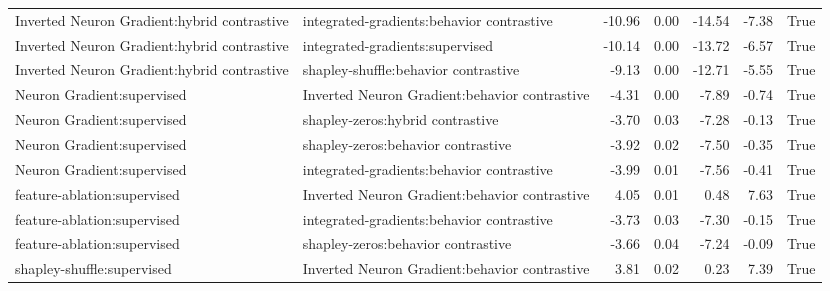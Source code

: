 \begin{table*}[ht]
{\begin{tabular}{llrrrrr}
 Inverted Neuron Gradient:hybrid contrastive & integrated-gradients:behavior contrastive & -10.96 & 0.00 & -14.54 & -7.38 & True \\
 Inverted Neuron Gradient:hybrid contrastive & integrated-gradients:supervised & -10.14 & 0.00 & -13.72 & -6.57 & True \\
 Inverted Neuron Gradient:hybrid contrastive & shapley-shuffle:behavior contrastive & -9.13 & 0.00 & -12.71 & -5.55 & True \\
 Neuron Gradient:supervised & Inverted Neuron Gradient:behavior contrastive & -4.31 & 0.00 & -7.89 & -0.74 & True \\
 Neuron Gradient:supervised & shapley-zeros:hybrid contrastive & -3.70 & 0.03 & -7.28 & -0.13 & True \\
 Neuron Gradient:supervised & shapley-zeros:behavior contrastive & -3.92 & 0.02 & -7.50 & -0.35 & True \\
 Neuron Gradient:supervised & integrated-gradients:behavior contrastive & -3.99 & 0.01 & -7.56 & -0.41 & True \\
 feature-ablation:supervised & Inverted Neuron Gradient:behavior contrastive & 4.05 & 0.01 & 0.48 & 7.63 & True \\
 feature-ablation:supervised & integrated-gradients:behavior contrastive & -3.73 & 0.03 & -7.30 & -0.15 & True \\
 feature-ablation:supervised & shapley-zeros:behavior contrastive & -3.66 & 0.04 & -7.24 & -0.09 & True \\
 shapley-shuffle:supervised & Inverted Neuron Gradient:behavior contrastive & 3.81 & 0.02 & 0.23 & 7.39 & True \\
\bottomrule
\end{tabular}
}
\end{table*}




\newpage

